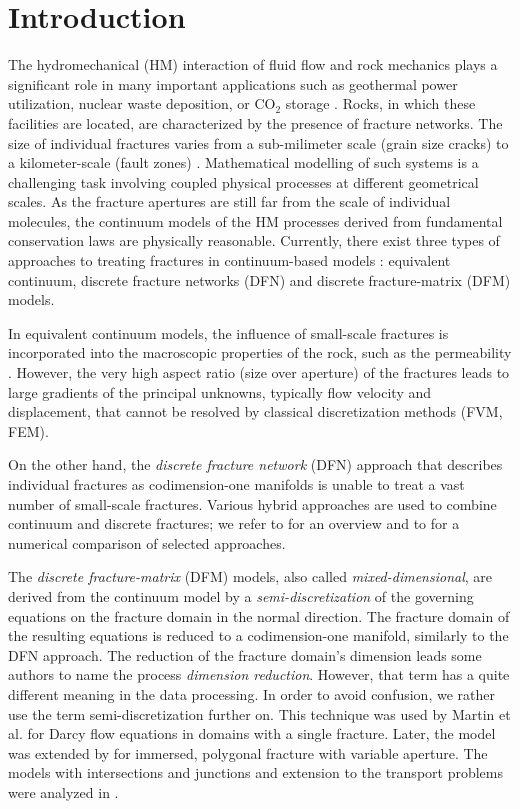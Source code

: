\documentclass[a4paper]{article}
\numberwithin{equation}{section}
\begin{document}
\section{Introduction}
The hydromechanical (HM) interaction of fluid flow and rock mechanics plays a significant role in many important applications such as geothermal power utilization, nuclear waste deposition, or CO${}_2$ storage \cite{rutqvist2003role}.
Rocks, in which these facilities are located, are characterized by the presence of fracture networks. The size of individual fractures varies from a sub-milimeter scale (grain size cracks) to a kilometer-scale (fault zones) \cite{Bonnet2001}.
Mathematical modelling of such systems is a challenging task involving coupled physical processes at different geometrical scales.
As the fracture apertures are still far from the scale of individual molecules, the continuum models of the HM processes derived from fundamental conservation laws are physically reasonable.
Currently, there exist three types of approaches to treating fractures in continuum-based models \cite{berre2019flow}: equivalent continuum, discrete fracture networks (DFN) and discrete fracture-matrix (DFM) models.

In equivalent continuum models, the influence of small-scale fractures is incorporated into the macroscopic properties of the rock, such as the permeability \cite{Oda1986,Rutqvist2013a}. However, the very high aspect ratio (size over aperture) of the fractures leads to large gradients of the principal unknowns, typically flow velocity and displacement, that cannot be resolved by classical discretization methods (FVM, FEM).
 
On the other hand, the \textit{discrete fracture network} (DFN) approach \cite{Follin2014methodology,Hyman2015dfnWorks} that describes individual fractures as codimension-one manifolds is unable to treat a vast number of small-scale fractures. Various hybrid approaches are used to combine continuum and discrete fractures; we refer to \cite{Jing2002} for an overview and to \cite{Zhao2013Impact} for a numerical comparison of selected approaches.

The \textit{discrete fracture-matrix} (DFM) models, also called \textit{mixed-dimensional}, are derived from the continuum model by a \textit{semi-discretization} of the governing equations on the fracture domain
in the normal direction. The fracture domain of the resulting equations is reduced to a codimension-one manifold, similarly to the DFN approach. The reduction of the fracture domain's dimension leads some authors to name the process \textit{dimension reduction}. However, that term has a quite different meaning in the data processing. In order to avoid confusion, we rather use the term semi-discretization further on.
% 
This technique was used by Martin et al. \cite{martin_modeling_2005} for Darcy flow equations in domains with a single fracture.
Later, the model was extended by \cite{angot2009asymptotic} for immersed, polygonal fracture with variable aperture. The models with intersections and junctions and extension to the transport problems were analyzed in \cite{maryska2005numerical,pichot2012generalized,formaggia2014reduced, schwenck2015dimensionally,hokr2016real}.
\end{document}
